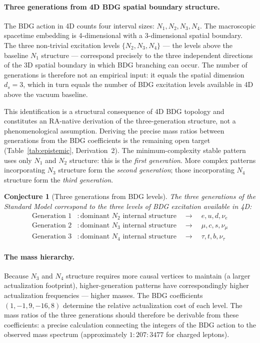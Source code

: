 \documentclass[11pt,a4paper]{article}
\newtheorem{conjecture}[theorem]{Conjecture}
\begin{document}
\paragraph{Three generations from 4D BDG spatial boundary structure.}
The BDG action in 4D counts four interval sizes: $N_1, N_2, N_3, N_4$.
The macroscopic spacetime embedding is 4-dimensional with a 3-dimensional
spatial boundary. The three non-trivial excitation levels $\{N_2, N_3, N_4\}$
--- the levels above the baseline $N_1$ structure --- correspond precisely
to the three independent directions of the 3D spatial boundary in which
BDG branching can occur. The number of generations is therefore not an
empirical input: it equals the spatial dimension $d_s = 3$, which in turn
equals the number of BDG excitation levels available in 4D above the
vacuum baseline.

This identification is a structural consequence of 4D BDG topology and constitutes
an RA-native derivation of the three-generation structure, not a phenomenological
assumption. Deriving the precise mass ratios between generations from the BDG
coefficients is the remaining open target (Table~\ref{tab:epistemic},
Derivation~2).
The minimum-complexity stable pattern uses only $N_1$ and $N_2$ structure:
this is the \emph{first generation}. More complex patterns incorporating
$N_3$ structure form the \emph{second generation}; those incorporating $N_4$
structure form the \emph{third generation}.

\begin{conjecture}[Three generations from BDG levels]
The three generations of the Standard Model correspond to the three levels
of BDG excitation available in 4D:
\begin{align}
  \text{Generation 1} &: \text{dominant }N_2\text{ internal structure}
  \quad\to\quad e, u, d, \nu_e\\
  \text{Generation 2} &: \text{dominant }N_3\text{ internal structure}
  \quad\to\quad \mu, c, s, \nu_\mu\\
  \text{Generation 3} &: \text{dominant }N_4\text{ internal structure}
  \quad\to\quad \tau, t, b, \nu_\tau
\end{align}
\end{conjecture}

\paragraph{The mass hierarchy.}
Because $N_3$ and $N_4$ structure requires more causal vertices to maintain
(a larger actualization footprint), higher-generation patterns have
correspondingly higher actualization frequencies --- higher masses. The BDG
coefficients $(1, -1, 9, -16, 8)$ determine the relative actualization cost
of each level. The mass ratios of the three generations should therefore
be derivable from these coefficients: a precise calculation connecting the
integers of the BDG action to the observed mass spectrum
(approximately $1 : 207 : 3477$ for charged leptons).
\end{document}
